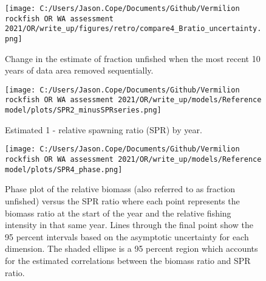 \documentclass[11pt,
  english,
  a4paper,
]{article}
\begin{document}
\tagmcend\tagstructend


\begin{figure}
\centering
\texttt{[image: C:/Users/Jason.Cope/Documents/Github/Vermilion rockfish OR WA assessment 2021/OR/write\_up/figures/retro/compare4\_Bratio\_uncertainty.png]}
\caption{Change in the estimate of fraction unfished when the most recent 10 years of data area removed sequentially.\label{fig:retro-depl}}
\end{figure}

\tagmcend\tagstructend

\newpage


\begin{figure}
\centering
\texttt{[image: C:/Users/Jason.Cope/Documents/Github/Vermilion rockfish OR WA assessment 2021/OR/write\_up/models/Reference model/plots/SPR2\_minusSPRseries.png]}
\caption{Estimated 1 - relative spawning ratio (SPR) by year.\label{fig:1-spr}}
\end{figure}

\tagmcend\tagstructend

\clearpage


\begin{figure}
\centering
\texttt{[image: C:/Users/Jason.Cope/Documents/Github/Vermilion rockfish OR WA assessment 2021/OR/write\_up/models/Reference model/plots/SPR4\_phase.png]}
\caption{Phase plot of the relative biomass (also referred to as fraction unfished) versus the SPR ratio where each point represents the biomass ratio at the start of the year and the relative fishing intensity in that same year. Lines through the final point show the 95 percent intervals based on the asymptotic uncertainty for each dimension. The shaded ellipse is a 95 percent region which accounts for the estimated correlations between the biomass ratio and SPR ratio.\label{fig:phase}}
\end{figure}
\end{document}

